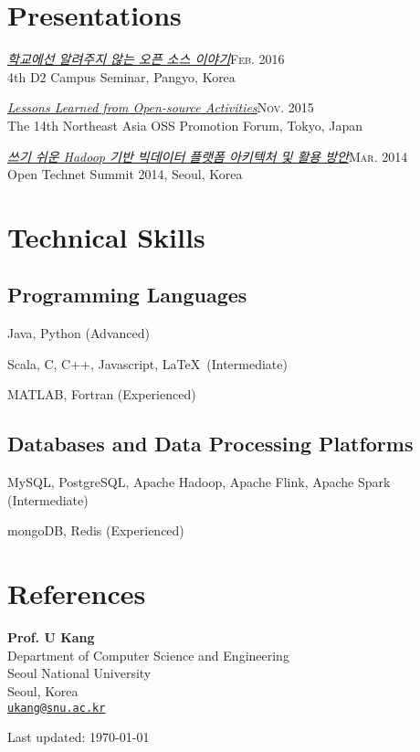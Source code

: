 \documentclass[11pt,a4paper]{article}
\renewenvironment{itemize}{
  \begin{list}{}{
    \setlength{\leftmargin}{1.5em}
    \setlength{\itemsep}{0.5em}
    \setlength{\parskip}{0pt}
    \setlength{\parsep}{0.25em}
  }
}{
  \end{list}
}
\begin{document}
\section*{Presentations}
\begin{itemize}
  \item \href{http://j.mp/d2-campus-seminar-4th-park}{\textit{학교에선 알려주지 않는 오픈 소스 이야기}}\hfill\textsc{Feb. 2016}\\
        4th D2 Campus Seminar, Pangyo, Korea
  \item \href{http://j.mp/cjkossforum-2015-park}{\textit{Lessons Learned from Open-source Activities}}\hfill\textsc{Nov. 2015}\\
        The 14th Northeast Asia OSS Promotion Forum, Tokyo, Japan
  \item \href{http://j.mp/ots-2014-park}{\textit{쓰기 쉬운 Hadoop 기반 빅데이터 플랫폼 아키텍처 및 활용 방안}}\hfill\textsc{Mar. 2014}\\
        Open Technet Summit 2014, Seoul, Korea
\end{itemize}

\section*{Technical Skills}
\subsection*{Programming Languages}
\begin{itemize}
  \setlength{\itemsep}{0.25em}
  \item Java, Python (Advanced)
  \item Scala, C, C++, Javascript, \LaTeX\ (Intermediate)
  \item MATLAB, Fortran (Experienced)
\end{itemize}
\subsection*{Databases and Data Processing Platforms}
\begin{itemize}
  \setlength{\itemsep}{0.25em}
  \item MySQL, PostgreSQL, Apache Hadoop, Apache Flink, Apache Spark (Intermediate)
  \item mongoDB, Redis (Experienced)
\end{itemize}

\section*{References}
\begin{itemize}
  \item \textbf{Prof. U Kang}\\
        Department of Computer Science and Engineering\\
        Seoul National University\\
        Seoul, Korea\\
        \href{mailto:ukang@snu.ac.kr}{\tt ukang@snu.ac.kr}
\end{itemize}

\bigskip
{\small Last updated: \today}
\end{document}
